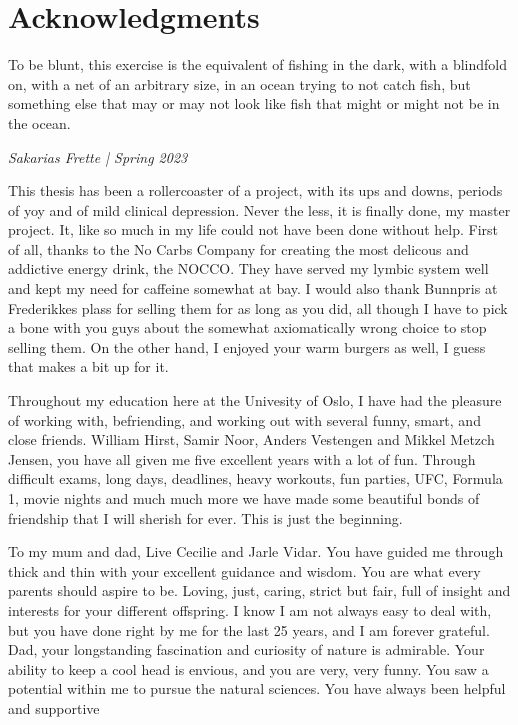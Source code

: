\chapter*{Acknowledgments}



\epigraph{
    To be blunt, this exercise is the equivalent of fishing in the dark, 
    with a blindfold on, with a net of an arbitrary size, 
in an ocean trying to not catch fish, but something else 
that may or may not look like fish that might or might not be in the ocean.}{\textit{Sakarias Frette | Spring 2023}}

This thesis has been a rollercoaster of a project, with its ups and downs, periods of yoy and of mild clinical depression.
Never the less, it is finally done, my master project. It, like so much in my life could not have been done without help. 
First of all, thanks to the No Carbs Company for creating the most delicous and addictive energy drink, the NOCCO. They have 
served my lymbic system well and kept my need for caffeine somewhat at bay. I would also thank Bunnpris at Frederikkes plass 
for selling them for as long as you did, all though I have to pick a bone with you guys about the somewhat axiomatically 
wrong choice to stop selling them. On the other hand, I enjoyed your warm burgers as well, I guess that makes a bit up for it. \par 
Throughout my education here at the Univesity of Oslo, I have had the pleasure of working with, befriending, 
and working out with several funny, smart, and close friends. William Hirst, Samir Noor, Anders Vestengen and 
Mikkel Metzch Jensen, you have all given me five excellent years with a lot of fun. Through difficult exams, long days, deadlines, 
heavy workouts, fun parties, UFC, Formula 1, movie nights and much much more we have made some beautiful bonds of friendship 
that I will sherish for ever. This is just the beginning. \par 
To my mum and dad, Live Cecilie and Jarle Vidar. You have guided me through thick and thin with your excellent guidance and wisdom. 
You are what every parents should aspire to be. Loving, just, caring, strict but fair, full of insight and interests for your 
different offspring. I know I am not always easy to deal with, but you have done right by me for the last 25 years, and I am 
forever grateful. Dad, your longstanding fascination and curiosity of nature  is admirable. Your ability to keep a cool head is envious, 
and you are very, very funny. You saw a potential within me to pursue the natural sciences. You have always been helpful and supportive 
